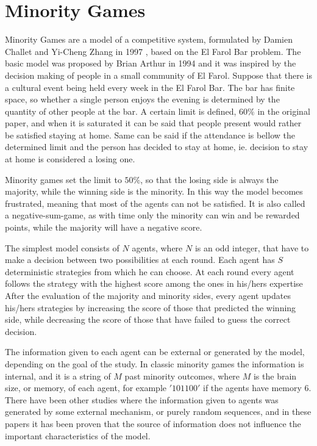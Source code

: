 \section{Minority Games}
\label{1:minority}
Minority Games are a model of a competitive system, formulated by Damien Challet and Yi-Cheng Zhang
in 1997 \cite{challet1997emergence}, based on the El Farol Bar problem. 
The basic model was proposed by Brian Arthur in 1994 \cite{arthur1994inductive} and it was inspired by the decision making of people in a small community of El Farol. 
Suppose that there is a cultural event being held every week in the El Farol Bar. 
The bar has finite space, so whether a single person enjoys the evening is determined by the quantity of other people at the bar. 
A certain limit is defined, $60\%$ in the original paper, and when it is saturated it can be said that people present would rather be satisfied staying at home. 
Same can be said if the attendance is bellow the determined limit and the person has decided to stay at home, ie. decision to stay at home is considered a losing one.

Minority games set the limit to $50\%$, so that the losing side is always the majority, while the winning side is the minority.
In this way the model becomes frustrated, meaning that most of the agents can not be satisfied.
It is also called a negative-sum-game, as with time only the minority can win and be rewarded points, while the majority will have a negative score.

The simplest model consists of $N$ agents, where $N$ is an odd integer, that have to make a decision between two possibilities at each round.
Each agent has $S$ deterministic strategies from which he can choose.
At each round every agent follows the strategy with the highest score among the ones in his/hers expertise
After the evaluation of the majority and minority sides, every agent updates his/hers strategies by increasing the score of those that predicted the winning side, while decreasing the score of those that have failed to guess the correct decision.

The information given to each agent can be external or generated by the model, depending on the goal of the study.
In classic minority games the information is internal, and it is a string of $M$ past minority outcomes, where $M$ is the brain size, or memory, of each agent, for example $'101100'$ if the agents have memory $6$.
There have been other studies where the information given to agents was generated by some external mechanism, or purely random sequences, and in these papers it has been proven that the source of information does not influence the important characteristics of the model.

